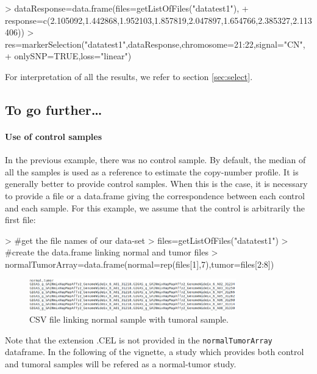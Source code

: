 \documentclass[a4paper,10pt]{article}
\begin{document}
\begin{Schunk}
\begin{Sinput}
> dataResponse=data.frame(files=getListOfFiles("datatest1"),
+ response=c(2.105092,1.442868,1.952103,1.857819,2.047897,1.654766,2.385327,2.113406))
> res=markerSelection("datatest1",dataResponse,chromosome=21:22,signal="CN",
+ onlySNP=TRUE,loss="linear")
\end{Sinput}
\end{Schunk}


			For interpretation of all the results, we refer to section \ref{sec:select}.

		\subsection{To go further\dots}

			\paragraph{Use of control samples}
  \label{mainusecontrol}
				In the previous example, there was no control sample. By default, the median of all the samples is used as a reference to estimate the copy-number profile. It is generally better to provide control samples. When this is the case, it is necessary to provide a file or a data.frame giving the correspondence between each control and each sample. For this example, we assume that the control is arbitrarily the first file:

\begin{Schunk}
\begin{Sinput}
> #get the file names of our data-set
> files=getListOfFiles("datatest1")
> #create the data.frame linking normal and tumor files
> normalTumorArray=data.frame(normal=rep(files[1],7),tumor=files[2:8])
\end{Sinput}
\end{Schunk}
	
				\begin{figure}[!h]
					\centering
					\includegraphics[width=0.8\textwidth]{fig/normalTumorArrayExample}
					\caption{CSV file linking normal sample with tumoral sample.}
				\end{figure}

				Note that the extension .CEL is not provided in the \texttt{normalTumorArray} dataframe.
				In the following of the vignette, a study which provides both control and tumoral samples will be refered as a normal-tumor study.
				
\end{document}

